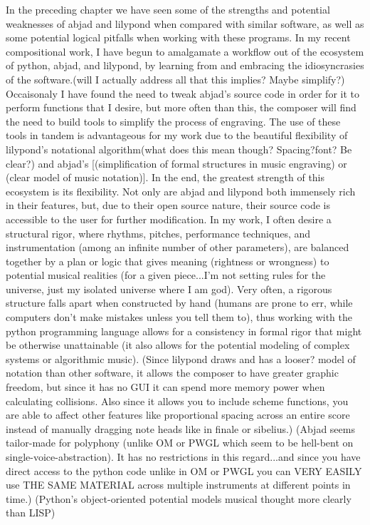 \documentclass{tufte-book}
\begin{document}
        In the preceding chapter we have seen some of the strengths and potential weaknesses of abjad and lilypond when compared with similar software, as well as some potential logical pitfalls when working with these programs. In my recent compositional work, I have begun to amalgamate a workflow out of the ecosystem of python, abjad, and lilypond, by learning from and embracing the idiosyncrasies of the software.(will I actually address all that this implies? Maybe simplify?) Occaisonaly I have found the need to tweak abjad's source code in order for it to perform functions that I desire, but more often than this, the composer will find the need to build tools to simplify the process of engraving. The use of these tools in tandem is advantageous for my work due to the beautiful flexibility of lilypond's notational algorithm(what does this mean though? Spacing?font? Be clear?) and abjad's [(simplification of formal structures in music engraving) or (clear model of music notation)]. In the end, the greatest strength of this ecosystem is its flexibility. Not only are abjad and lilypond both immensely rich in their features, but, due to their open source nature, their source code is accessible to the user for further modification. In my work, I often desire a structural rigor, where rhythms, pitches, performance techniques, and instrumentation (among an infinite number of other parameters), are balanced together by a plan or logic that gives meaning (rightness or wrongness) to potential musical realities (for a given piece...I'm not setting rules for the universe, just my isolated universe where I am god). Very often, a rigorous structure falls apart when constructed by hand (humans are prone to err, while computers don't make mistakes unless you tell them to), thus working with the python programming language allows for a consistency in formal rigor that might be otherwise unattainable (it also allows for the potential modeling of complex systems or algorithmic music). (Since lilypond draws and has a looser{?} model of notation than other software, it allows the composer to have greater graphic freedom, but since it has no GUI it can spend more memory power when calculating collisions. Also since it allows you to include scheme functions, you are able to affect other features like proportional spacing across an entire score instead of manually dragging note heads like in finale or sibelius.) (Abjad seems tailor-made for polyphony (unlike OM or PWGL which seem to be hell-bent on single-voice-abstraction). It has no restrictions in this regard...and since you have direct access to the python code {unlike in OM or PWGL} you can VERY EASILY use THE SAME MATERIAL across multiple instruments at different points in time.) (Python's object-oriented potential models musical thought more clearly than LISP)
		
\end{document}
